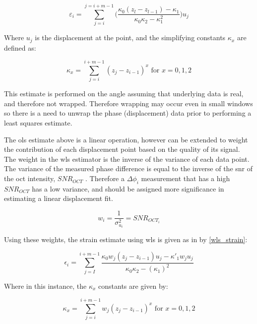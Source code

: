 \begin{equation}
	\label{ols_strain}
	\varepsilon_i = \sum\limits_{j=i}^{j=i+m-1} \bigg(\frac{\kappa_0 (z_l-z_{l-1})-\kappa_1}{\kappa_0 \kappa_2 - \kappa_1^2} \bigg) u_j
\end{equation}

Where $u_j$ is the displacement at the point, and the simplifying constants $\kappa_x$ are defined as:

\begin{equation}
	\label{ols_k}
	\kappa_x = \sum \limits_{j=i}^{i+m-1} (z_j - z_{i-1})^x \text{   for   } x = 0,1,2
\end{equation}

This estimate is performed on the angle assuming that underlying data is real, and therefore not wrapped. Therefore wrapping may occur even in small windows so there is a need to unwrap the phase (displacement) data prior to performing a least squares estimate. 

The \ac{ols} estimate above is a linear operation, however can be extended to weight the contribution of each displacement point based on the quality of its signal. 
The weight in the \ac{wls} estimator is the inverse of the variance of each data point.
The variance of the measured phase difference is equal to the inverse of the \ac{snr} of the \ac{oct} intensity, $SNR_{OCT}$ \cite{goodman_statistical_2015}. Therefore a $\Delta \phi_i$ measurement that has a high $SNR_{OCT}$ has a low variance, and should be assigned more significance in estimating a linear displacement fit. 

\begin{equation}
	\label{wls_w}
	w_i = \frac{1}{\sigma_{u_i}^2} = SNR_{OCT_i}
\end{equation}

Using these weights, the strain estimate using \ac{wls} is given as in \cite{kennedy_strain_2012} by \autoref{wls_strain}:

\begin{equation}
	\label{wls_strain}
	\epsilon_i = \sum \limits_{j=I}^{i+m-1} \frac{\kappa_0 w_j (z_j - z_{i-1}) u_j - \kappa'_1 w_	j u_j}{\kappa_0 \kappa_2 - (\kappa_1)^2}
\end{equation}

Where in this instance, the $\kappa_x$ constants are given by:

\begin{equation}
	\label{wls_k}
	\kappa_x = \sum \limits_{j=i}^{i+m-1} w_j (z_j - z_{i-1})^x \text{   for   } x=0,1,2
\end{equation}

